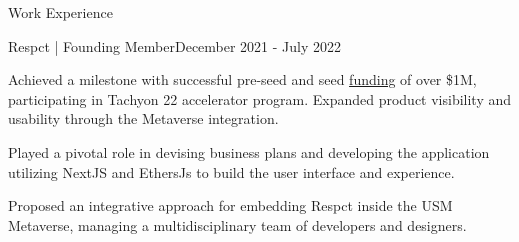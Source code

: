 \documentclass[10pt]{resume}
\begin{document}
\begin{rSection}{Work Experience}
    
    	\begin{rSubsection}{Respct | Founding Member}{December 2021 - July 2022}
                \item Achieved a milestone with successful pre-seed and seed \href{https://inc42.com/buzz/meet-the-31-web3-startups-that-are-part-of-first-cohort-of-polygonleap-2021/}{funding} of over \$1M, participating in Tachyon 22 accelerator program. Expanded product visibility and usability through the Metaverse integration.
               \item Played a pivotal role in devising business plans and developing the application utilizing NextJS and EthersJs to build the user interface and experience. 
                \item Proposed an integrative approach for embedding Respct inside the USM Metaverse, managing a multidisciplinary team of developers and designers. 
    	\end{rSubsection}
    
    \end{rSection}
    
\end{document}
